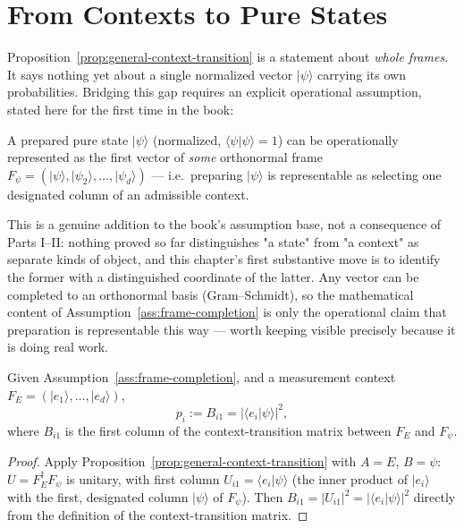 \section{From Contexts to Pure States}

Proposition~\ref{prop:general-context-transition} is a statement about
\emph{whole frames}. It says nothing yet about a single normalized vector
$|\psi\rangle$ carrying its own probabilities. Bridging this gap requires an
explicit operational assumption, stated here for the first time in the book:

\begin{assumption}
\label{ass:frame-completion}
A prepared pure state $|\psi\rangle$ (normalized, $\langle\psi|\psi\rangle=1$)
can be operationally represented as the first vector of \emph{some}
orthonormal frame $F_\psi = (|\psi\rangle,|\psi_2\rangle,\dots,|\psi_d\rangle)$
— i.e.\ preparing $|\psi\rangle$ is representable as selecting one designated
column of an admissible context.
\end{assumption}

This is a genuine addition to the book's assumption base, not a consequence
of Parts I--II: nothing proved so far distinguishes "a state" from "a
context" as separate kinds of object, and this chapter's first substantive
move is to identify the former with a distinguished coordinate of the latter.
Any vector can be completed to an orthonormal basis (Gram--Schmidt), so the
mathematical content of Assumption~\ref{ass:frame-completion} is only the
operational claim that preparation is representable this way — worth keeping
visible precisely because it is doing real work.

\begin{theorem}
\label{thm:pure-state-born}
Given Assumption~\ref{ass:frame-completion}, and a measurement context $F_E =
(|e_1\rangle,\dots,|e_d\rangle)$,
\begin{equation}
p_i := B_{i1} = |\langle e_i|\psi\rangle|^2,
\end{equation}
where $B_{i1}$ is the first column of the context-transition matrix between
$F_E$ and $F_\psi$.
\end{theorem}

\begin{proof}
Apply Proposition~\ref{prop:general-context-transition} with $A=E$, $B=\psi$:
$U = F_E^\dagger F_\psi$ is unitary, with first column $U_{i1} =
\langle e_i|\psi\rangle$ (the inner product of $|e_i\rangle$ with the first,
designated column $|\psi\rangle$ of $F_\psi$). Then $B_{i1} = |U_{i1}|^2 =
|\langle e_i|\psi\rangle|^2$ directly from the definition of the
context-transition matrix.
\end{proof}

